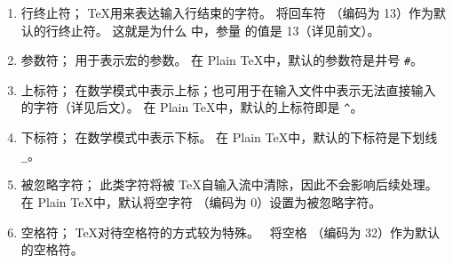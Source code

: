 \documentclass{book}
\begin{document}
\begin{enumerate}
\item{}\label{ini:eol}行终止符；
        \TeX 用来表达输入行结束的字符。
        \IniTeX 将回车符 （\ascii 编码为 13）作为默认的行终止符。
        这就是为什么 \IniTeX 中，参量  的值是 13（详见前文）。
\item{}参数符；
        用于表示宏的参数。
        在 Plain \TeX 中，默认的参数符是井号 \verb-#-。
\item{}上标符；
        在数学模式中表示上标；也可用于在输入文件中表示无法直接输入的字符（详见后文）。
        在 Plain \TeX 中，默认的上标符即是 \verb_^_。
\item{}下标符；
        在数学模式中表示下标。
        在 Plain \TeX 中，默认的下标符是下划线 \verb-_-。
\item{}被忽略字符；
        此类字符将被 \TeX 自输入流中清除，因此不会影响后续处理。
        在 Plain \TeX 中，默认将空字符 （\ascii 编码为 0）设置为被忽略字符。
\item{}\label{ini:sp}空格符；
        \TeX 对待空格符的方式较为特殊。
        \IniTeX\ 将空格 （\ascii 编码为 32）作为默认的空格符。

\end{enumerate}
\end{document}
